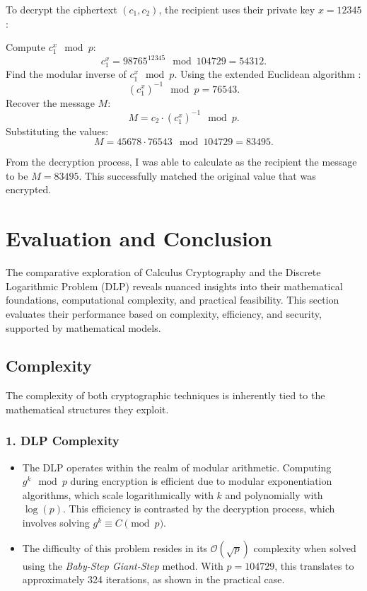 \documentclass[12pt]{article}
\begin{document}
To decrypt the ciphertext \( (c_1, c_2) \), the recipient uses their private key \( x = 12345 \):

\centering Compute \( c_1^x \mod p \):
\[
c_1^x = 98765^{12345} \mod 104729 = 54312.
\]
Find the modular inverse of \( c_1^x \mod p \). Using the extended Euclidean algorithm \cite{ModularInverse}:
\[
(c_1^x)^{-1} \mod p = 76543.
\]
Recover the message \( M \):
\[
M = c_2 \cdot (c_1^x)^{-1} \mod p.
\]
Substituting the values:
\[
M = 45678 \cdot 76543 \mod 104729 = 83495.
\]

\raggedright
\setlength{\parindent}{0.5in} %

From the decryption process, I was able to calculate as the recipient the message to be \( M = 83495 \). This successfully matched the original value that was encrypted.







\section*{Evaluation and Conclusion}

The comparative exploration of Calculus Cryptography and the Discrete Logarithmic Problem (DLP) reveals nuanced insights into their mathematical foundations, computational complexity, and practical feasibility. This section evaluates their performance based on complexity, efficiency, and security, supported by mathematical models.

\subsection*{Complexity}

The complexity of both cryptographic techniques is inherently tied to the mathematical structures they exploit.

\subsubsection*{1. DLP Complexity}
\begin{itemize}
    \item The DLP operates within the realm of modular arithmetic. Computing \( g^k \mod p \) during encryption is efficient due to modular exponentiation algorithms, which scale logarithmically with \( k \) and polynomially with \( \log(p) \). This efficiency is contrasted by the decryption process, which involves solving \( g^k \equiv C \pmod{p} \).
    \item The difficulty of this problem resides in its \( \mathcal{O}(\sqrt{p}) \) complexity when solved using the \textit{Baby-Step Giant-Step} method. With \( p = 104729 \), this translates to approximately 324 iterations, as shown in the practical case.
\end{itemize}
\end{document}
